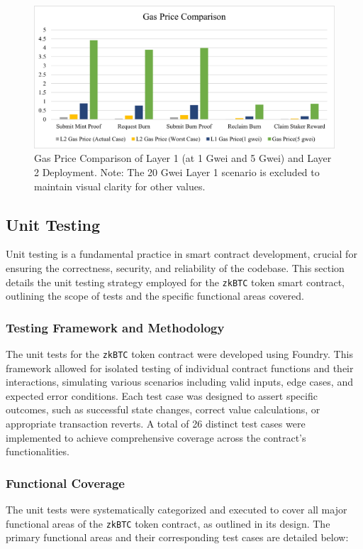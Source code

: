 \documentclass{DESSThesis}
\newcommand{\zktoken}{\texttt{zkBTC}}
\begin{document}
\begin{figure}[h!]
    \centering
    \includegraphics[width=1\textwidth]{img/gas_fee_comparison_2.png}
    \caption{Gas Price Comparison of Layer 1 (at 1 Gwei and 5 Gwei) and Layer 2 Deployment. Note: The 20 Gwei Layer 1 scenario is excluded to maintain visual clarity for other values.}
    \label{fig:gas_comparison}
\end{figure}


\subsection{Unit Testing}
Unit testing is a fundamental practice in smart contract development, crucial for ensuring the correctness, security, and reliability of the codebase. This section details the unit testing strategy employed for the \texttt{\zktoken} token smart contract, outlining the scope of tests and the specific functional areas covered.

\subsubsection{Testing Framework and Methodology}
The unit tests for the \texttt{\zktoken} token contract were developed using Foundry. This framework allowed for isolated testing of individual contract functions and their interactions, simulating various scenarios including valid inputs, edge cases, and expected error conditions. Each test case was designed to assert specific outcomes, such as successful state changes, correct value calculations, or appropriate transaction reverts. A total of 26 distinct test cases were implemented to achieve comprehensive coverage across the contract's functionalities.

\subsubsection{Functional Coverage}
The unit tests were systematically categorized and executed to cover all major functional areas of the \texttt{\zktoken} token contract, as outlined in its design. The primary functional areas and their corresponding test cases are detailed below:
\end{document}

